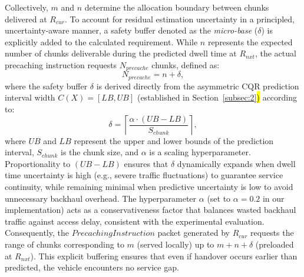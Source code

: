 \documentclass[journal]{IEEEtran}
\begin{document}
Collectively, $m$ and $n$ determine the allocation boundary between chunks delivered at $R_{cur}$.
%
To account for residual estimation uncertainty in a principled, uncertainty-aware manner, a safety buffer denoted as the \textit{micro-base} ($\delta$) is explicitly added to the calculated requirement.
While $n$ represents the expected number of chunks deliverable during the predicted dwell time at $R_{nxt}$, the actual precaching instruction requests $N_{precache}$ chunks, defined as:
\begin{equation}
    N_{precache} = n + \delta, \label{eq:n_precache}
\end{equation}
where the safety buffer $\delta$ is derived directly from the asymmetric CQR prediction interval width $C(X) = [LB, UB]$ (established in Section~\ref{subsec:2}\hl) according to:
\begin{equation}
    \delta = \left\lceil \frac{\alpha \cdot (UB - LB)}{S_{chunk}} \right\rceil, \label{eq:delta}
\end{equation}
where $UB$ and $LB$ represent the upper and lower bounds of the prediction interval, $S_{chunk}$ is the chunk size, and $\alpha$ is a scaling hyperparameter. Proportionality to $(UB - LB)$ ensures that $\delta$ dynamically expands when dwell time uncertainty is high (e.g., severe traffic fluctuations) to guarantee service continuity, while remaining minimal when predictive uncertainty is low to avoid unnecessary backhaul overhead. The hyperparameter $\alpha$ (set to $\alpha = 0.2$ in our implementation) acts as a conservativeness factor that balances wasted backhaul traffic against access delay, consistent with the experimental evaluation.
Consequently, the \(Precaching Instruction\) packet generated by $R_{cur}$ requests the range of chunks corresponding to $m$ (served locally) up to $m + n + \delta$ (preloaded at $R_{nxt}$). This explicit buffering ensures that even if handover occurs earlier than predicted, the vehicle encounters no service gap.
\end{document}
